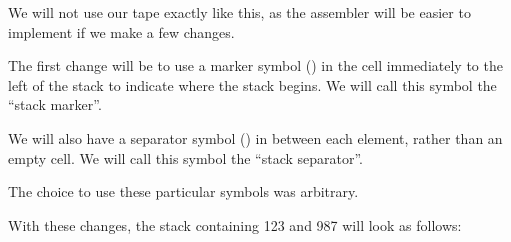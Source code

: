 \begin{center}
\end{center}

We will not use our tape exactly like this, as the assembler will be easier to implement if we make a few changes.

The first change will be to use a marker symbol (\symb{*}) in the cell immediately to the left of the stack to indicate where the stack begins. We will call this symbol the ``stack marker''.

We will also have a separator symbol (\symb{,}) in between each element, rather than an empty cell. We will call this symbol the ``stack separator''.

The choice to use these particular symbols was arbitrary.

With these changes, the stack containing 123 and 987 will look as follows:


